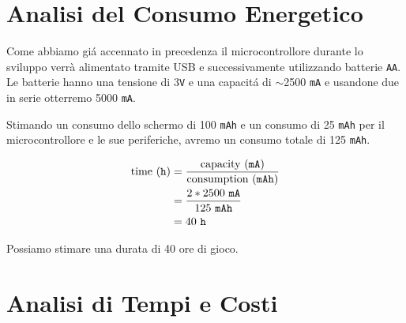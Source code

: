 \documentclass[a4paper]{article}
\begin{document}
\section{Analisi del Consumo Energetico}

Come abbiamo gi\'a accennato in precedenza il microcontrollore durante lo sviluppo verrà alimentato tramite USB e successivamente utilizzando batterie \texttt{AA}. Le batterie hanno una tensione di 3\texttt{V} e una capacit\'a di $\sim$2500 \texttt{mA} e usandone due in serie otterremo 5000 \texttt{mA}.

Stimando un consumo dello schermo di 100 \texttt{mAh} e un consumo di 25 \texttt{mAh} per il microcontrollore e le sue periferiche, avremo un consumo totale di 125 \texttt{mAh}.

\begin{equation*}
    \begin{aligned}
        \textmd{time} \ (\texttt{h}) & = \frac{\textmd{capacity} \ (\texttt{mA})}{\textmd{consumption} \ (\texttt{mAh})}\\
                                     & = \frac{2 * 2500 \ \texttt{mA}}{125 \ \texttt{mAh}}\\
                                     & = 40 \ \texttt{h}
    \end{aligned}
\end{equation*}

Possiamo stimare una durata di 40 ore di gioco.

\section{Analisi di Tempi e Costi}
\end{document}
